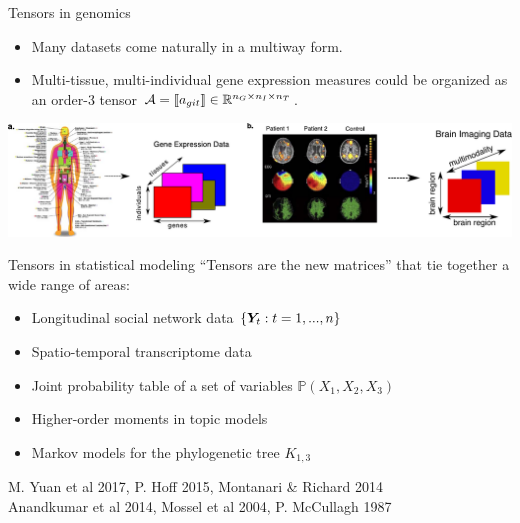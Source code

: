 \documentclass[10pt, mathserif]{beamer} %
\theoremstyle{definition}
\theoremstyle{plain}
\begin{document}
\begin{frame}{Tensors in genomics}

\begin{itemize}
\item Many datasets come naturally in a multiway form.
\item Multi-tissue, multi-individual gene expression measures could be organized as an order-3 tensor $\mathcal{A}=\llbracket a_{git} \rrbracket\in \mathbb{R}^{n_G\times n_I\times n_T}$.
\end{itemize}
\bigskip
\centerline{\includegraphics[width=\textwidth]{Figures/example.pdf}}
\bigskip
\end{frame}


\begin{frame}{Tensors in statistical modeling}
``Tensors are the new matrices'' that tie together a wide range of areas:
\bigskip
\begin{itemize}
\item Longitudinal social network data $\{\bm Y_t: t=1,...,n\}$
\item Spatio-temporal transcriptome data
\item Joint probability table of a set of variables $\mathbb{P}(X_1,X_2,X_3)$
\item Higher-order moments in topic models
\item Markov models for the phylogenetic tree $K_{1,3}$
\end{itemize}
\bigskip
\hfill {\scriptsize M. Yuan et al 2017, P. Hoff 2015, Montanari \& Richard 2014}\\
\hfill{\scriptsize  Anandkumar et al 2014, Mossel et al 2004, P. McCullagh 1987}
\end{frame}
\end{document}
